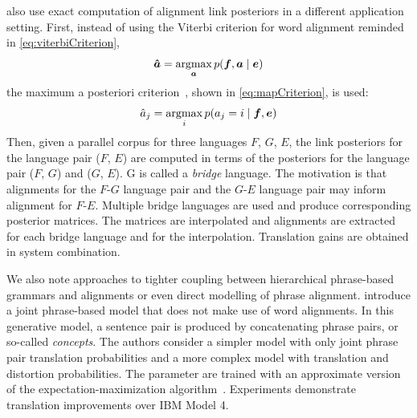 \citet{kumar-och-macherey:2007:EMNLP} also use exact computation
of alignment link posteriors in a different application setting.
First, instead of using the Viterbi criterion for word alignment
reminded in \autoref{eq:viterbiCriterion},
%
\begin{equation}
  \bm{\hat{a}} = \operatorname*{argmax}_{\bm{a}} p(\bm{f}, \bm{a} \mid \bm{e})
  \label{eq:viterbiCriterion}
\end{equation}
%
the maximum a posteriori criterion~\citep{matusov-zens-ney:2004:COLING}, shown in \autoref{eq:mapCriterion}, is used:
%
\begin{equation}
  \hat{a}_j = \operatorname*{argmax}_{i} p(a_j = i \mid \bm{f}, \bm{e})
  \label{eq:mapCriterion}
\end{equation}
%
Then, given a parallel corpus for three languages $F$, $G$, $E$, the
link posteriors for the language pair ($F$, $E$) are computed
in terms of the posteriors for the language pair ($F$, $G$) and ($G$, $E$).
G is called a \emph{bridge} language. The motivation is that
alignments for the $F$-$G$ language pair and the $G$-$E$ language
pair may inform alignment for $F$-$E$. Multiple bridge languages are used
and produce corresponding posterior matrices. The matrices are interpolated
and alignments are extracted for each bridge language and for the
interpolation. Translation gains are obtained in system combination.

We also note approaches to tighter coupling between hierarchical phrase-based
grammars and alignments or even direct modelling of phrase alignment.
\citet{marcu-wong:2002:EMNLP} introduce a joint phrase-based model that
does not make use of word alignments. In this generative model, a sentence
pair is produced by concatenating phrase pairs, or so-called \emph{concepts}.
The authors consider a simpler model with only joint phrase pair translation
probabilities and a more complex model with translation and distortion
probabilities. The parameter are trained with an approximate version of the
expectation-maximization algorithm~\citep{dempster-laird-rubin:1977:JRSS}.
Experiments demonstrate translation improvements over IBM Model 4.

